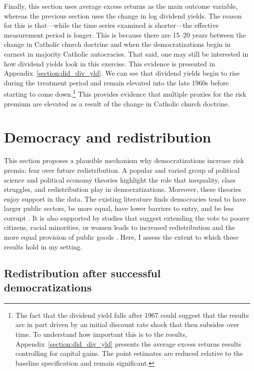 \documentclass[12pt]{article}
\numberwithin{equation}{section}
\begin{document}
Finally, this section uses average excess returns as the main outcome variable, whereas the previous section uses the change in log dividend yields. The reason for this is that---while the time series examined is shorter---the effective measurement period is longer. This is because there are 15--20 years between the change in Catholic church doctrine and when the democratizations begin in earnest in majority Catholic autocracies. That said, one may still be interested in how dividend yields look in this exercise. This evidence is presented in Appendix~\ref{section:did_div_yld}. We can see that dividend yields begin to rise during the treatment period and remain elevated into the late 1960s before starting to come down.\footnote{The fact that the dividend yield falls after 1967 could suggest that the results are in part driven by an initial discount rate shock that then subsides over time. To understand how important this is to the results, Appendix~\ref{section:did_div_yld} presents the average excess returns results controlling for capital gains. The point estimates are reduced relative to the baseline specification and remain significant.} This provides evidence that multiple proxies for the risk premium are elevated as a result of the change in Catholic church doctrine.


\section{Democracy and redistribution}\label{section:redistribution}

This section proposes a plausible mechanism why democratizations increase risk premia: fear over future redistribution. A popular and varied group of political science and political economy theories highlight the role that inequality, class struggles, and redistribution play in democratizations.  Moreover, these theories enjoy support in the data. The existing literature finds democracies tend to have larger public sectors, be more equal, have lower barriers to entry, and be less corrupt \citep{Fisman2001,Boix2003,Kolstad2016,Acemoglu2015,Rock2016}. It is also supported by studies that suggest extending the vote to poorer citizens, racial minorities, or women leads to increased redistribution and the more equal provision of public goods \citep{Husted1997,Miller2008,Naidu2012,Cascio2013,Fujiwara2015}. Here, I assess the extent to which these results hold in my setting.

\subsection{Redistribution after successful democratizations}\label{section:redistribution_emp}
\end{document}
